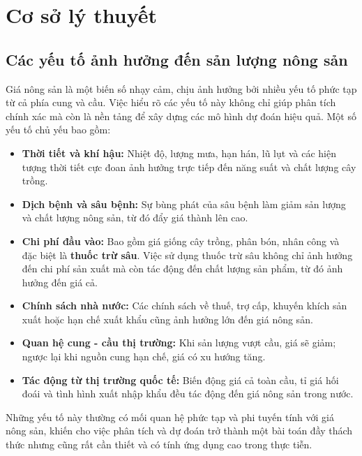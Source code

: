 \section{Cơ sở lý thuyết}
\subsection{ Các yếu tố ảnh hưởng đến sản lượng nông sản}

Giá nông sản là một biến số nhạy cảm, chịu ảnh hưởng bởi nhiều yếu tố phức tạp từ cả phía cung và cầu. Việc hiểu rõ các yếu tố này không chỉ giúp phân tích chính xác mà còn là nền tảng để xây dựng các mô hình dự đoán hiệu quả. Một số yếu tố chủ yếu bao gồm:

\begin{itemize}
    \item \textbf{Thời tiết và khí hậu:} Nhiệt độ, lượng mưa, hạn hán, lũ lụt và các hiện tượng thời tiết cực đoan ảnh hưởng trực tiếp đến năng suất và chất lượng cây trồng.
    
    \item \textbf{Dịch bệnh và sâu bệnh:} Sự bùng phát của sâu bệnh làm giảm sản lượng và chất lượng nông sản, từ đó đẩy giá thành lên cao.

    \item \textbf{Chi phí đầu vào:} Bao gồm giá giống cây trồng, phân bón, nhân công và đặc biệt là \textbf{thuốc trừ sâu}. Việc sử dụng thuốc trừ sâu không chỉ ảnh hưởng đến chi phí sản xuất mà còn tác động đến chất lượng sản phẩm, từ đó ảnh hưởng đến giá cả.

    \item \textbf{Chính sách nhà nước:} Các chính sách về thuế, trợ cấp, khuyến khích sản xuất hoặc hạn chế xuất khẩu cũng ảnh hưởng lớn đến giá nông sản.

    \item \textbf{Quan hệ cung - cầu thị trường:} Khi sản lượng vượt cầu, giá sẽ giảm; ngược lại khi nguồn cung hạn chế, giá có xu hướng tăng.

    \item \textbf{Tác động từ thị trường quốc tế:} Biến động giá cả toàn cầu, tỉ giá hối đoái và tình hình xuất nhập khẩu đều tác động đến giá nông sản trong nước.
\end{itemize}

Những yếu tố này thường có mối quan hệ phức tạp và phi tuyến tính với giá nông sản, khiến cho việc phân tích và dự đoán trở thành một bài toán đầy thách thức nhưng cũng rất cần thiết và có tính ứng dụng cao trong thực tiễn.


